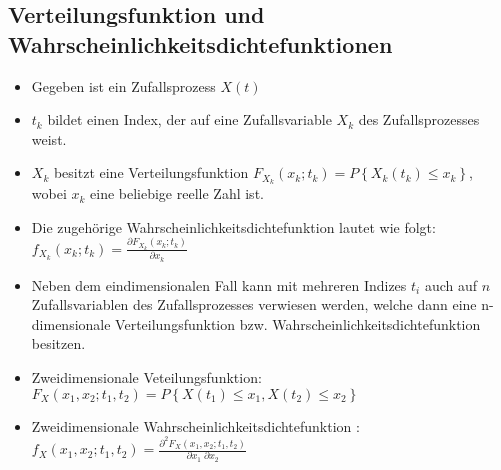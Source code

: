 \documentclass[10pt, a4paper]{article}
\begin{document}
\subsection{Verteilungsfunktion und Wahrscheinlichkeitsdichtefunktionen}
\begin{itemize}
  \item Gegeben ist ein Zufallsprozess $X(t)$
  \item $t_{k}$ bildet einen Index, der auf eine Zufallsvariable $X_{k}$ des Zufallsprozesses 
        weist.
  \item $X_{k}$ besitzt eine Verteilungsfunktion
        $F_{X_{k}}(x_{k};t_{k})  = P\left\lbrace X_{k}(t_{k}) \leq x_{k}\right\rbrace$,
        wobei $x_{k}$ eine beliebige reelle Zahl ist.
  \item Die zugeh\"orige Wahrscheinlichkeitsdichtefunktion lautet wie folgt:
        $f_{X_{k}}(x_{k};t_{k})  = \frac{\partial F_{X_{k}}(x_{k};t_{k})}{\partial x_{k}}$
  \item Neben dem eindimensionalen Fall kann mit mehreren Indizes $t_{i}$ auch auf 
        $n$ Zufallsvariablen des Zufallsprozesses verwiesen werden, welche dann eine
        n-dimensionale Verteilungsfunktion bzw. Wahrscheinlichkeitsdichtefunktion besitzen.
  \item Zweidimensionale Veteilungsfunktion: 
        $F_{X}(x_{1},x_{2};t_{1},t_{2}) =
          P\left\lbrace X(t_{1}) \leq x_{1}, X(t_{2}) \leq x_{2} \right\rbrace$
  \item Zweidimensionale Wahrscheinlichkeitsdichtefunktion :
        $f_{X}(x_{1},x_{2};t_{1},t_{2}) =
          \frac{\partial^{2} F_{X}(x_{1},x_{2};t_{1},t_{2})}{\partial x_{1}\;\partial x_{2}}$
\end{itemize} 
\end{document}
